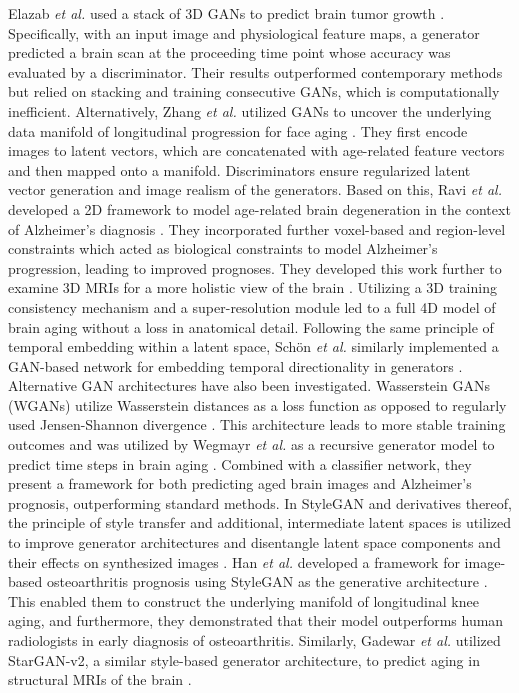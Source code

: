 		Elazab \textit{et al.} used a stack of 3D GANs to predict brain tumor growth \cite{NL2016150352}. Specifically, with an input image and physiological feature maps, a generator predicted a brain scan at the proceeding time point whose accuracy was evaluated by a discriminator. Their results outperformed contemporary methods but relied on stacking and training consecutive GANs, which is computationally inefficient. Alternatively, Zhang \textit{et al.} utilized GANs to uncover the underlying data manifold of longitudinal progression for face aging \cite{zhang2017age}. They first encode images to latent vectors, which are concatenated with age-related feature vectors and then mapped onto a manifold. Discriminators ensure regularized latent vector generation and image realism of the generators. Based on this, Ravi \textit{et al.} developed a 2D framework to model age-related brain degeneration in the context of Alzheimer's diagnosis \cite{RaviAlex2019}. They incorporated further voxel-based and region-level constraints which acted as biological constraints to model Alzheimer's progression, leading to improved prognoses. They developed this work further to examine 3D MRIs for a more holistic view of the brain \cite{Ravi2022}. Utilizing a 3D training consistency mechanism and a super-resolution module led to a full 4D model of brain aging without a loss in anatomical detail. Following the same principle of temporal embedding within a latent space, Schön \textit{et al.} similarly implemented a GAN-based network for embedding temporal directionality in generators \cite{SchonSelvan23}. Alternative GAN architectures have also been investigated. Wasserstein GANs (WGANs) utilize Wasserstein distances as a loss function as opposed to regularly used Jensen-Shannon divergence \cite{pmlr-v70-arjovsky17a}. This architecture leads to more stable training outcomes and was utilized by Wegmayr \textit{et al.} as a recursive generator model to predict time steps in brain aging \cite{Wegmayr2019}. Combined with a classifier network, they present a framework for both predicting aged brain images and Alzheimer's prognosis, outperforming standard methods. In StyleGAN and derivatives thereof, the principle of style transfer and additional, intermediate latent spaces is utilized to improve generator architectures and disentangle latent space components and their effects on synthesized images \cite{Karras_2019_CVPR, Karras_2020_CVPR, Fetty2020}. Han \textit{et al.} developed a framework for image-based osteoarthritis prognosis using StyleGAN as the generative architecture \cite{Han2022}. This enabled them to construct the underlying manifold of longitudinal knee aging, and furthermore, they demonstrated that their model outperforms human radiologists in early diagnosis of osteoarthritis. Similarly, Gadewar \textit{et al.} utilized StarGAN-v2, a similar style-based generator architecture, to predict aging in structural MRIs of the brain \cite{Gadewar2023, Gadewar2023a}. 

